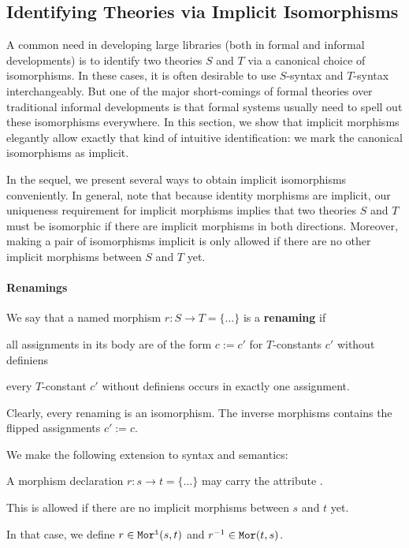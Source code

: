 \subsection{Identifying Theories via Implicit Isomorphisms}\label{sec:inverse}

A common need in developing large libraries (both in formal and informal developments) is to identify two theories $S$ and $T$ via a canonical choice of isomorphisms.
In these cases, it is often desirable to use $S$-syntax and $T$-syntax interchangeably.
But one of the major short-comings of formal theories over traditional informal developments is that formal systems usually need to spell out these isomorphisms everywhere.
In this section, we show that implicit morphisms elegantly allow exactly that kind of intuitive identification: we mark the canonical isomorphisms as implicit.

In the sequel, we present several ways to obtain implicit isomorphisms conveniently.
In general, note that because identity morphisms are implicit, our uniqueness requirement for implicit morphisms implies that two theories $S$ and $T$ must be isomorphic if there are implicit morphisms in both directions.
Moreover, making a pair of isomorphisms implicit is only allowed if there are no other implicit morphisms between $S$ and $T$ yet.

\paragraph{Renamings}
We say that a named morphism $r:S\to T=\{\ldots\}$ is a \textbf{renaming} if
\begin{compactitem}
 \item all assignments in its body are of the form $c:=c'$ for $T$-constants $c'$ without definiens
 \item every  $T$-constant $c'$ without definiens occurs in exactly one assignment.
\end{compactitem}
Clearly, every renaming is an isomorphism.
The inverse morphisms contains the flipped assignments $c':=c$.

We make the following extension to syntax and semantics:
\begin{compactitem}
  \item A morphism declaration $r:s\to t=\{\ldots\}$ may carry the attribute .
  \item This is allowed if there are no implicit morphisms between $s$ and $t$ yet.
  \item In that case, we define $r\in\mathtt{Mor^i}(s,t)$ and $r^{-1}\in\mathtt{Mor}(t,s)$.
\end{compactitem}

